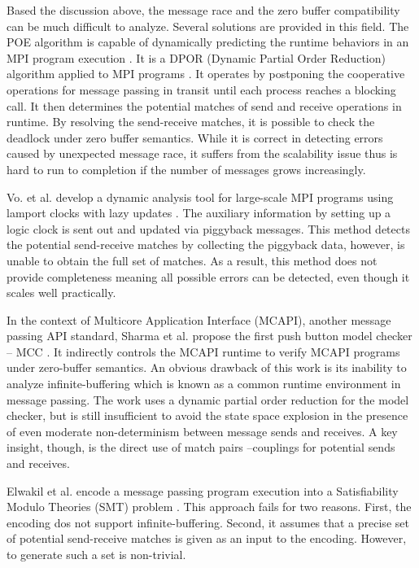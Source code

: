 Based the discussion above, the message race and the zero buffer compatibility can be much difficult to analyze. Several solutions are provided in this field. The POE algorithm is capable of dynamically predicting the runtime behaviors in an MPI program execution \cite{DBLP:conf/ppopp/VakkalankaSGK08}. It is a DPOR (Dynamic Partial Order Reduction) algorithm applied to MPI programs \cite{DBLP:conf/popl/FlanaganG05}. It operates by postponing the cooperative operations for message passing in transit until each process reaches a blocking call. It then determines the potential matches of send and receive operations in runtime. By resolving the send-receive matches, it is possible to check the deadlock under zero buffer semantics. While it is correct in detecting errors caused by unexpected message race, it suffers from the scalability issue thus is hard to run to completion if the number of messages grows increasingly. 

Vo. et al. develop a dynamic analysis tool for large-scale MPI programs using lamport clocks with lazy updates \cite{DBLP:conf/sc/VoAGSSB10, DBLP:conf/IEEEpact/VoGKSSB11}. The auxiliary information by setting up a logic clock is sent out and updated via piggyback messages. This method detects the potential send-receive matches by collecting the piggyback data, however, is unable to obtain the full set of matches. As a result, this method does not provide completeness meaning all possible errors can be detected, even though it scales well practically.

In the context of Multicore Application Interface (MCAPI), another message passing API standard, Sharma et al. propose the first push button model checker -- MCC \cite{DBLP:conf/fmcad/SharmaGMH09}. It indirectly controls the MCAPI runtime to verify MCAPI programs under zero-buffer semantics. An obvious drawback of this work is its inability to analyze infinite-buffering which is known as a common runtime environment in message passing. The work uses a dynamic partial order reduction for the model checker, but is still insufficient to avoid the state space explosion in the presence of even moderate non-determinism between message sends and receives. A key insight, though, is the direct use of match pairs --couplings for potential sends and receives.

Elwakil et al. encode a message passing program execution into a Satisfiability Modulo Theories (SMT) problem \cite{barrett2008satisfiability}. This approach fails for two reasons. First, the encoding dos not support infinite-buffering. Second, it assumes that a precise set of potential send-receive matches is given as an input to the encoding. However, to generate such a set is non-trivial.

